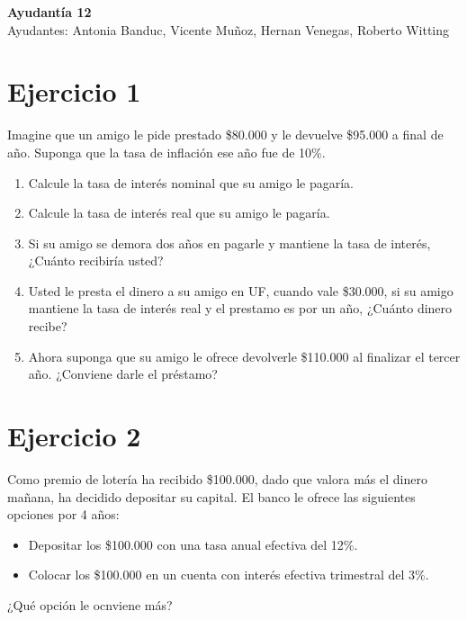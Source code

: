 \documentclass[11pt,letterpaper]{article}
\begin{document}
\begin{center}
    \textbf{\Large{Ayudantía 12}}\\
    Ayudantes: Antonia Banduc, Vicente Muñoz, Hernan Venegas, Roberto Witting
\end{center}


\section*{Ejercicio 1}
Imagine que un amigo le pide prestado \$80.000 y le devuelve \$95.000 a final de año. Suponga que la tasa de inflación ese año fue de 10\%.
\begin{enumerate}
    \item Calcule la tasa de interés nominal que su amigo le pagaría.
\item Calcule la tasa de interés real que su amigo le pagaría.
\item Si su amigo se demora dos años en pagarle y mantiene la tasa de interés, ¿Cuánto recibiría usted?
\item  Usted le presta el dinero a su amigo en UF, cuando vale \$30.000, si su amigo mantiene la tasa de
interés real y el prestamo es por un año, ¿Cuánto dinero recibe?
\item Ahora suponga que su amigo le ofrece devolverle \$110.000 al finalizar el tercer año. ¿Conviene darle
el préstamo?
\end{enumerate}

\section*{Ejercicio 2}

Como premio de lotería ha recibido \$100.000, dado que valora más el dinero mañana, ha
decidido depositar su capital. El banco le ofrece las siguientes opciones por 4 años:
\begin{itemize}
    \item Depositar los \$100.000 con una tasa anual efectiva del 12\%.
    \item Colocar los \$100.000 en un cuenta con interés efectiva trimestral del 3\%. 
\end{itemize}

¿Qué opción le ocnviene más?

\end{document}
